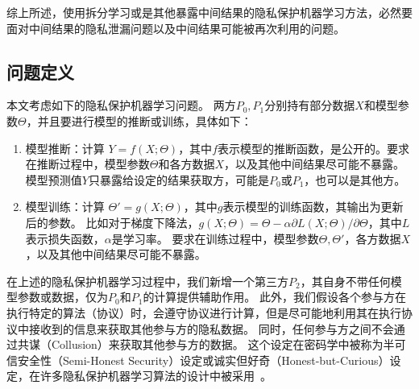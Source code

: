 综上所述，使用拆分学习或是其他暴露中间结果的隐私保护机器学习方法，必然要面对中间结果的隐私泄漏问题以及中间结果可能被再次利用的问题。


\subsection{问题定义}
本文考虑如下的隐私保护机器学习问题。
两方$P_0, P_1$分别持有部分数据$X$和模型参数$\Theta$，并且要进行模型的推断或训练，具体如下：
\begin{enumerate}[label=(\arabic*)]
    \item 模型推断：计算 $Y = f(X; \Theta)$，其中$f$表示模型的推断函数，是公开的。要求在推断过程中，模型参数$\Theta$和各方数据$X$，以及其他中间结果尽可能不暴露。
    模型预测值$Y$只暴露给设定的结果获取方，可能是$P_0$或$P_1$，也可以是其他方。
    \item 模型训练：计算 $\Theta' = g(X; \Theta)$，其中$g$表示模型的训练函数，其输出为更新后的参数。
    比如对于梯度下降法，$g(X;\Theta) = \Theta - \alpha \partial L(X;\Theta) / \partial \Theta$，其中$L$表示损失函数，$\alpha$是学习率。
    要求在训练过程中，模型参数$\Theta, \Theta'$，各方数据$X$，以及其他中间结果尽可能不暴露。
\end{enumerate}

在上述的隐私保护机器学习过程中，我们新增一个第三方$P_2$，其自身不带任何模型参数或数据，仅为$P_0$和$P_1$的计算提供辅助作用。
此外，我们假设各个参与方在执行特定的算法（协议）时，会遵守协议进行计算，但是尽可能地利用其在执行协议中接收到的信息来获取其他参与方的隐私数据。
同时，任何参与方之间不会通过共谋（Collusion）来获取其他参与方的数据。
%
这个设定在密码学中被称为半可信安全性（Semi-Honest Security）设定或诚实但好奇（Honest-but-Curious）设定，在许多隐私保护机器学习算法的设计中被采用~\cite{wagh2019securenn,mohassel2018aby3,riazi_2018_chameleon}。